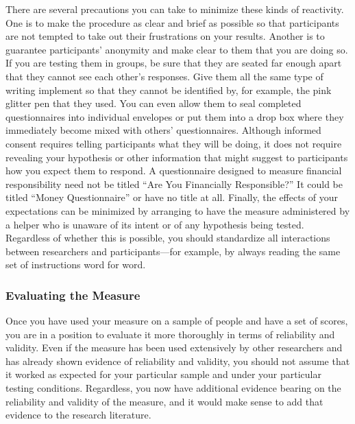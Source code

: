 \documentclass[
]{krantz}
\begin{document}
There are several precautions you can take to minimize these kinds of reactivity. One is to make the procedure as clear and brief as possible so that participants are not tempted to take out their frustrations on your results. Another is to guarantee participants' anonymity and make clear to them that you are doing so. If you are testing them in groups, be sure that they are seated far enough apart that they cannot see each other's responses. Give them all the same type of writing implement so that they cannot be identified by, for example, the pink glitter pen that they used. You can even allow them to seal completed questionnaires into individual envelopes or put them into a drop box where they immediately become mixed with others' questionnaires. Although informed consent requires telling participants what they will be doing, it does not require revealing your hypothesis or other information that might suggest to participants how you expect them to respond. A questionnaire designed to measure financial responsibility need not be titled ``Are You Financially Responsible?'' It could be titled ``Money Questionnaire'' or have no title at all. Finally, the effects of your expectations can be minimized by arranging to have the measure administered by a helper who is unaware of its intent or of any hypothesis being tested. Regardless of whether this is possible, you should standardize all interactions between researchers and participants---for example, by always reading the same set of instructions word for word.

\subsubsection*{Evaluating the Measure}\label{evaluating-the-measure}


Once you have used your measure on a sample of people and have a set of scores, you are in a position to evaluate it more thoroughly in terms of reliability and validity. Even if the measure has been used extensively by other researchers and has already shown evidence of reliability and validity, you should not assume that it worked as expected for your particular sample and under your particular testing conditions. Regardless, you now have additional evidence bearing on the reliability and validity of the measure, and it would make sense to add that evidence to the research literature.
\end{document}
